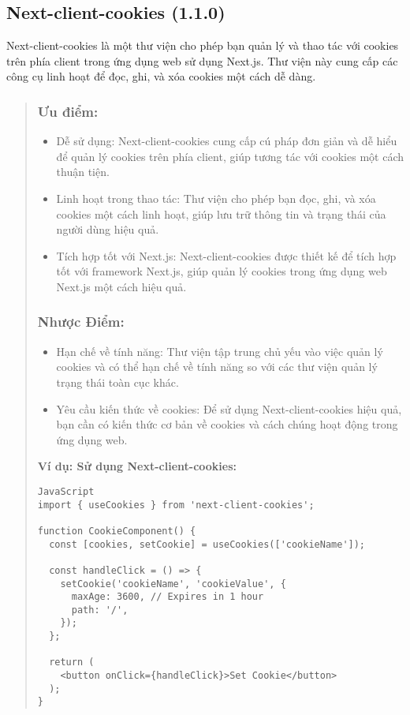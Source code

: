 \subsection{Next-client-cookies (1.1.0)}

Next-client-cookies là một thư viện cho phép bạn quản lý và thao tác với cookies trên phía client trong ứng dụng web sử dụng Next.js. Thư viện này cung cấp các công cụ linh hoạt để đọc, ghi, và xóa cookies một cách dễ dàng.

\begin{quote}
\subsubsection{Ưu điểm:}
\begin{itemize}
  \item Dễ sử dụng: Next-client-cookies cung cấp cú pháp đơn giản và dễ hiểu để quản lý cookies trên phía client, giúp tương tác với cookies một cách thuận tiện.
  \item Linh hoạt trong thao tác: Thư viện cho phép bạn đọc, ghi, và xóa cookies một cách linh hoạt, giúp lưu trữ thông tin và trạng thái của người dùng hiệu quả.
  \item Tích hợp tốt với Next.js: Next-client-cookies được thiết kế để tích hợp tốt với framework Next.js, giúp quản lý cookies trong ứng dụng web Next.js một cách hiệu quả.
\end{itemize}

\subsubsection{Nhược Điểm:}
\begin{itemize}
  \item Hạn chế về tính năng: Thư viện tập trung chủ yếu vào việc quản lý cookies và có thể hạn chế về tính năng so với các thư viện quản lý trạng thái toàn cục khác.
  \item Yêu cầu kiến thức về cookies: Để sử dụng Next-client-cookies hiệu quả, bạn cần có kiến thức cơ bản về cookies và cách chúng hoạt động trong ứng dụng web.
\end{itemize}

\textbf{Ví dụ: Sử dụng Next-client-cookies:}
\begin{lstlisting}
JavaScript
import { useCookies } from 'next-client-cookies';

function CookieComponent() {
  const [cookies, setCookie] = useCookies(['cookieName']);

  const handleClick = () => {
    setCookie('cookieName', 'cookieValue', {
      maxAge: 3600, // Expires in 1 hour
      path: '/',
    });
  };

  return (
    <button onClick={handleClick}>Set Cookie</button>
  );
}
\end{lstlisting}
\end{quote}

